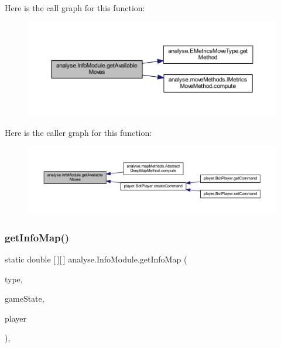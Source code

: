 Here is the call graph for this function\+:
\nopagebreak
\begin{figure}[H]
\begin{center}
\leavevmode
\includegraphics[width=350pt]{classanalyse_1_1_info_module_a6dfaaeb16de4ae73d9d0a72acc8817a0_cgraph}
\end{center}
\end{figure}
Here is the caller graph for this function\+:
\nopagebreak
\begin{figure}[H]
\begin{center}
\leavevmode
\includegraphics[width=350pt]{classanalyse_1_1_info_module_a6dfaaeb16de4ae73d9d0a72acc8817a0_icgraph}
\end{center}
\end{figure}
\mbox{\label{classanalyse_1_1_info_module_aff90c966df80003e7495ca1d74116024}} 
\subsubsection{\texorpdfstring{get\+Info\+Map()}{getInfoMap()}}
{\footnotesize\ttfamily static double \mbox{[}$\,$\mbox{]}\mbox{[}$\,$\mbox{]} analyse.\+Info\+Module.\+get\+Info\+Map (\begin{DoxyParamCaption}\item[{\mbox{\hyperlink{enumanalyse_1_1_e_metrics_map_type}{E\+Metrics\+Map\+Type}}}]{type,  }\item[{\mbox{\hyperlink{classgame_1_1game_state_1_1_game_state}{Game\+State}}}]{game\+State,  }\item[{\mbox{\hyperlink{enumgame_1_1_e_player}{E\+Player}}}]{player }\end{DoxyParamCaption})\hspace{0.3cm}{\ttfamily [inline]}, {\ttfamily [static]}}

